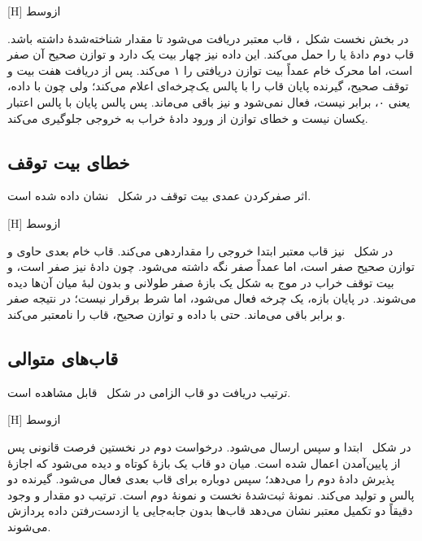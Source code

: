 [H]
‌ازوسط

در بخش نخست شکل~، قاب  معتبر دریافت می‌شود تا
 مقدار شناخته‌شدهٔ  داشته باشد. قاب دوم دادهٔ
 یا  را حمل می‌کند. این داده نیز چهار بیت یک دارد و توازن
صحیح آن صفر است، اما محرک خام عمداً بیت توازن دریافتی را ۱ می‌کند. پس از دریافت هفت بیت
و توقف صحیح، گیرنده پایان قاب را با پالس یک‌چرخه‌ای  اعلام می‌کند؛
ولی چون  با  داده، یعنی ۰، برابر نیست،
 فعال نمی‌شود و  نیز  باقی می‌ماند. پس
پالس پایان با پالس اعتبار یکسان نیست و خطای توازن از ورود دادهٔ خراب به خروجی جلوگیری
می‌کند.


\subsection{خطای بیت توقف}

اثر صفرکردن عمدی بیت توقف در شکل~ نشان داده شده است.

[H]
‌ازوسط

در شکل~ نیز قاب معتبر  ابتدا خروجی را مقداردهی می‌کند. قاب
خام بعدی حاوی  و توازن صحیح صفر است، اما  عمداً صفر نگه داشته
می‌شود. چون  دادهٔ  نیز صفر است،  و بیت توقف خراب در موج به
شکل یک بازهٔ صفر طولانی و بدون لبهٔ میان آن‌ها دیده می‌شوند. در پایان بازه،
 یک چرخه فعال می‌شود، اما شرط  برقرار نیست؛ در
نتیجه  صفر و  برابر  باقی می‌ماند. حتی با
داده و توازن صحیح،  قاب را نامعتبر می‌کند.


\subsection{قاب‌های متوالی}

ترتیب دریافت دو قاب الزامی در شکل~ قابل مشاهده است.

[H]
‌ازوسط

در شکل~ ابتدا  و سپس  ارسال می‌شود. درخواست
دوم در نخستین فرصت قانونی پس از پایین‌آمدن  اعمال شده است. میان دو قاب یک بازهٔ
کوتاه  و  دیده می‌شود که اجازهٔ پذیرش دادهٔ دوم را می‌دهد؛ سپس
 دوباره برای قاب بعدی فعال می‌شود. گیرنده دو پالس  و
 تولید می‌کند. نمونهٔ ثبت‌شدهٔ نخست  و نمونهٔ دوم
 است. ترتیب دو مقدار و وجود دقیقاً دو تکمیل معتبر نشان می‌دهد قاب‌ها بدون
جابه‌جایی یا از‌دست‌رفتن داده پردازش می‌شوند.


